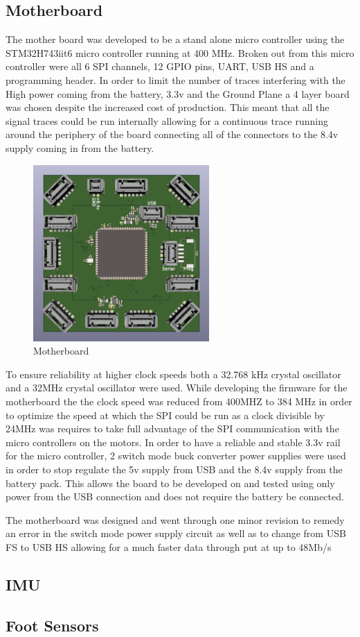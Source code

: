 \subsection{Motherboard}
The mother board was developed to be a stand alone micro controller using the STM32H743iit6 micro controller running at 400 MHz. Broken out from this micro controller were all 6 SPI channels, 12 GPIO pins, UART, USB HS and a programming header. In order to limit the number of traces interfering with the High power  coming from the battery, 3.3v and the Ground Plane a 4 layer board was chosen despite the increased cost of production. This meant that all the signal traces could be run internally allowing for a continuous trace running around the periphery of the board connecting all of the connectors to the 8.4v supply coming in from the battery.
\begin{figure}[H]
       \centering
       \includegraphics[width=0.6\textwidth]{figures/Motherboard.png}
       \caption{Motherboard}
       \label{fig:my_label}
   \end{figure}
To ensure reliability at higher clock speeds both a 32.768 kHz crystal oscillator and a 32MHz crystal oscillator were used. While developing the firmware for the motherboard the the clock speed was reduced from 400MHZ to 384 MHz in order to optimize the speed at which the SPI could be run as a clock divisible by 24MHz was requires to take full advantage of the SPI communication with the micro controllers on the motors. In order to have a reliable and stable 3.3v rail for the micro controller, 2 switch mode buck converter power supplies were used in order to stop regulate the 5v supply from USB and the 8.4v supply from the battery pack. This allows the board to be developed on and tested using only power from the USB connection and does not require the battery be connected. 
  
   The motherboard was designed and went through one minor revision to remedy an error in the switch mode power supply circuit as well as to change from USB FS to USB HS allowing for a much faster data  through put at up to 48Mb/s
\subsection{IMU}

\subsection{Foot Sensors}